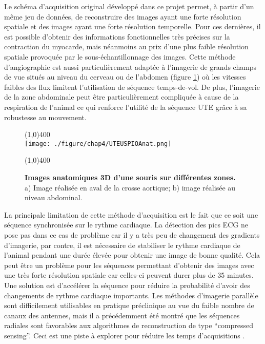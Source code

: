 Le schéma d’acquisition original développé dans ce projet permet, à partir d’un même jeu de données, de reconstruire des images ayant une forte résolution spatiale et des images ayant une forte résolution temporelle. Pour ces dernières, il est possible d’obtenir des informations fonctionnelles très précises sur la contraction du myocarde, mais néanmoins au prix d’une plus faible résolution spatiale provoquée par le sous-échantillonnage des images. Cette méthode d'angiographie est aussi particulièrement adaptée à l'imagerie de grands champs de vue situés au niveau du cerveau ou de l'abdomen (figure \ref{fig:UTEUSPIOAnat}) où les vitesses faibles des flux limitent l'utilisation de séquence temps-de-vol. De plus, l'imagerie de la zone abdominale peut être particulièrement compliquée à cause de la respiration de l'animal ce qui renforce l'utilité de la séquence UTE grâce à sa robustesse au mouvement. 

\begin{figure}[H]
\centering
\line(1,0){400} \\
\texttt{[image: ./figure/chap4/UTEUSPIOAnat.png]}
\caption[Images anatomiques 3D d'une souris sur différentes zones.]{\label{fig:UTEUSPIOAnat} \textbf{Images anatomiques 3D d'une souris sur différentes zones.} a) Image réalisée en aval de la crosse aortique; b) image réalisée au niveau abdominal.}
\line(1,0){400} \\ 
\end{figure}

La principale limitation de cette méthode d’acquisition est le fait que ce soit une séquence synchronisée sur le rythme cardiaque. La détection des pics ECG ne pose pas dans ce cas de problème car il y a très peu de changement des gradients d’imagerie, par contre, il est nécessaire de stabiliser le rythme cardiaque de l’animal pendant une durée élevée pour obtenir une image de bonne qualité. Cela peut être un problème pour les séquences permettant d’obtenir des images avec une très forte résolution spatiale car celles-ci peuvent durer plus de 35 minutes. Une solution est d’accélérer la séquence pour réduire la probabilité d’avoir des changements de rythme cardiaque importants. Les méthodes d’imagerie parallèle sont difficilement utilisables en pratique préclinique au vue du faible nombre de canaux des antennes, mais il a précédemment été montré que les séquences radiales sont favorables aux algorithmes de reconstruction de type “compressed sensing”. Ceci est une piste à explorer pour réduire les temps d'acquisitions \cite{Nam:2013nx}.
 
